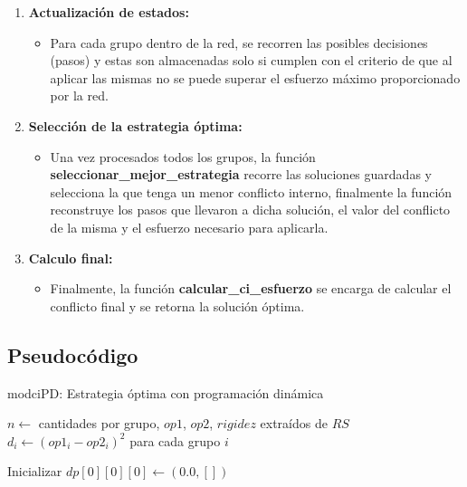 \documentclass[11pt,letter]{article}
\begin{document}
\begin{itemize}
\begin{enumerate}
\begin{itemize}
    \end{itemize}

    \item \textbf{Actualización de estados:}
    \begin{itemize}
        \item Para cada grupo dentro de la red, se recorren las posibles decisiones (pasos) y estas son almacenadas solo si cumplen con el criterio de que al aplicar las mismas no se puede superar el esfuerzo máximo proporcionado por la red.
    \end{itemize}

    \item \textbf{Selección de la estrategia óptima:}
     \begin{itemize}
        \item Una vez procesados todos los grupos, la función \textbf{seleccionar\_mejor\_estrategia} recorre las soluciones guardadas y selecciona la que tenga un menor conflicto interno, finalmente la función reconstruye los pasos que llevaron a dicha solución, el valor del conflicto de la misma y el esfuerzo necesario para aplicarla.
    \end{itemize}

    \item \textbf{Calculo final:}
     \begin{itemize}
        \item Finalmente, la función \textbf{calcular\_ci\_esfuerzo } se  encarga de calcular el conflicto final y se retorna la solución óptima.
    \end{itemize}
\end{enumerate}

    \subsection{Pseudocódigo}
    \begin{algorithm}[H]
    \caption{modciPD: Estrategia óptima con programación dinámica}

    $n \leftarrow$ cantidades por grupo, $op1$, $op2$, $rigidez$ extraídos de $RS$ \\
    $d_i \leftarrow (op1_i - op2_i)^2$ para cada grupo $i$ 

    Inicializar $dp[0][0][0] \leftarrow (0.0, [])$ 


\end{algorithm}
\end{itemize}
\end{document}
